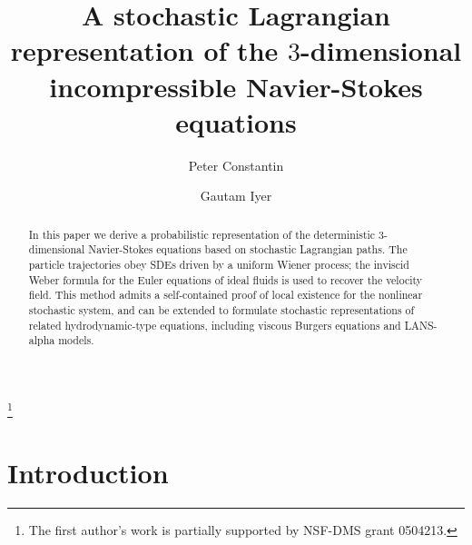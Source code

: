 \documentclass[final]{amsart}%
\numberwithin{equation}{section}
\theoremstyle{definition}
\theoremstyle{remark}
\begin{document}
\title[A stochastic representation of the Navier-Stokes equations]{A stochastic Lagrangian representation of the $3$-dimensional incompressible Navier-Stokes equations}
\author{Peter Constantin}
\thanks{The first author's work is partially supported by NSF-DMS grant 0504213.}
\address{%
Department of Mathematics\\
University of Chicago\\
Chicago IL 60637}
\author{Gautam Iyer}
\address{%
Department of Mathematics\\
University of Chicago\\
Chicago IL 60637}
\begin{abstract}
In this paper we derive a probabilistic representation of the deterministic $3$-dimensional Navier-Stokes equations based on stochastic Lagrangian paths. The particle trajectories obey SDEs driven by a uniform Wiener process; the inviscid Weber formula for the Euler equations of ideal fluids is used to recover the velocity field. This method admits a self-contained proof of local existence for the nonlinear stochastic system, and can be extended to formulate stochastic representations of related hydrodynamic-type equations, including viscous Burgers equations and LANS-alpha models.%
\end{abstract}
\maketitle

\section{Introduction}\label{s:intro}%
%
\end{document}
